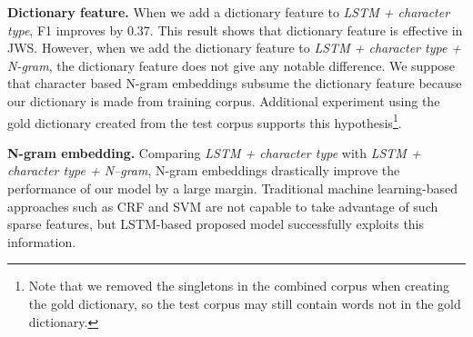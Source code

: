 \documentclass[11pt,letterpaper]{article}
\begin{document}
\noindent
{\bf Dictionary feature.} When we add a dictionary feature to {\it LSTM + character type}, F1 improves by 0.37. This result shows that dictionary feature is effective in JWS. However, when we add the dictionary feature to {\it LSTM + character type + N-gram}, the dictionary feature does not give any notable difference. We suppose that character based N-gram embeddings subsume the dictionary feature because our dictionary is made from training corpus. 
Additional experiment using the gold dictionary created from the test corpus supports this hypothesis\footnote{Note that we removed the singletons in the combined corpus when creating the gold dictionary, so the test corpus may still contain words not in the gold dictionary.}. 

\noindent
{\bf N-gram embedding.} Comparing {\it LSTM + character type} with {\it LSTM + character type + N--gram}, N-gram embeddings drastically improve the performance of our model by a large margin. Traditional machine learning-based approaches such as CRF and SVM are not capable to take advantage of such sparse features, but LSTM-based proposed model successfully exploits this information.
\end{document}
